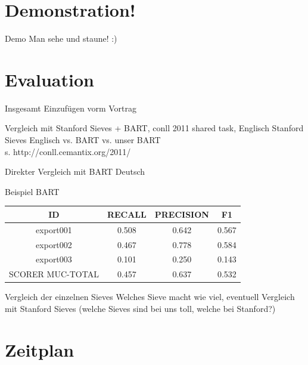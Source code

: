 \documentclass[11pt,a4paper]{beamer}
\begin{document}
\section{Demonstration!}
\begin{frame}{Demo}
Man sehe und staune! :)
\end{frame}


\section{Evaluation}
\begin{frame}{Insgesamt}
Einzufügen vorm Vortrag
\end{frame}

\begin{frame}{Vergleich mit Stanford Sieves + BART, conll 2011 shared task, Englisch}
Stanford Sieves Englisch vs. BART vs. unser BART\\

s. http://conll.cemantix.org/2011/
\end{frame}

\begin{frame}{Direkter Vergleich mit BART Deutsch}

Beispiel BART

\begin{tabular}{|c|c|c|c|}
\hline 
ID & RECALL & PRECISION & F1 \\ 
\hline 
export001 & 0.508 & 0.642 & 0.567 \\ 
\hline 
export002 & 0.467 & 0.778   & 0.584 \\ 
\hline 
export003 & 0.101 & 0.250 & 0.143 \\ 
\hline 
SCORER MUC-TOTAL & 0.457 & 0.637   & 0.532 \\
\hline

\end{tabular} 
\end{frame}

\begin{frame}{Vergleich der einzelnen Sieves}
Welches Sieve macht wie viel, eventuell Vergleich mit Stanford Sieves (welche Sieves sind bei uns toll, welche bei Stanford?)

\end{frame}
  

\section{Zeitplan}
\end{document}
